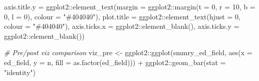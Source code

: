 \documentclass[
]{book}
\newenvironment{Shaded}{\begin{snugshade}}{\end{snugshade}}
\newcommand{\AttributeTok}[1]{\textcolor[rgb]{0.77,0.63,0.00}{#1}}
\newcommand{\CommentTok}[1]{\textcolor[rgb]{0.56,0.35,0.01}{\textit{#1}}}
\newcommand{\DecValTok}[1]{\textcolor[rgb]{0.00,0.00,0.81}{#1}}
\newcommand{\FunctionTok}[1]{\textcolor[rgb]{0.00,0.00,0.00}{#1}}
\newcommand{\NormalTok}[1]{#1}
\newcommand{\OtherTok}[1]{\textcolor[rgb]{0.56,0.35,0.01}{#1}}
\newcommand{\SpecialCharTok}[1]{\textcolor[rgb]{0.00,0.00,0.00}{#1}}
\newcommand{\StringTok}[1]{\textcolor[rgb]{0.31,0.60,0.02}{#1}}
\begin{document}
\begin{Shaded}
\begin{Highlighting}[]
               \AttributeTok{axis.title.y =}\NormalTok{ ggplot2}\SpecialCharTok{::}\FunctionTok{element\_text}\NormalTok{(}\AttributeTok{margin =}\NormalTok{ ggplot2}\SpecialCharTok{::}\FunctionTok{margin}\NormalTok{(}\AttributeTok{t =} \DecValTok{0}\NormalTok{, }\AttributeTok{r =} \DecValTok{10}\NormalTok{, }\AttributeTok{b =} \DecValTok{0}\NormalTok{, }\AttributeTok{l =} \DecValTok{0}\NormalTok{), }\AttributeTok{colour =} \StringTok{"\#404040"}\NormalTok{),}
               \AttributeTok{plot.title =}\NormalTok{ ggplot2}\SpecialCharTok{::}\FunctionTok{element\_text}\NormalTok{(}\AttributeTok{hjust =} \DecValTok{0}\NormalTok{, }\AttributeTok{colour =} \StringTok{"\#404040"}\NormalTok{),}
               \AttributeTok{axis.ticks.x =}\NormalTok{ ggplot2}\SpecialCharTok{::}\FunctionTok{element\_blank}\NormalTok{(),}
               \AttributeTok{axis.ticks.y =}\NormalTok{ ggplot2}\SpecialCharTok{::}\FunctionTok{element\_blank}\NormalTok{())}

\CommentTok{\# Pre/post viz comparison}
\NormalTok{viz\_pre }\OtherTok{\textless{}{-}}\NormalTok{ ggplot2}\SpecialCharTok{::}\FunctionTok{ggplot}\NormalTok{(smmry\_ed\_field, }\FunctionTok{aes}\NormalTok{(}\AttributeTok{x =}\NormalTok{ ed\_field, }\AttributeTok{y =}\NormalTok{ n, }\AttributeTok{fill =} \FunctionTok{as.factor}\NormalTok{(ed\_field))) }\SpecialCharTok{+}
\NormalTok{           ggplot2}\SpecialCharTok{::}\FunctionTok{geom\_bar}\NormalTok{(}\AttributeTok{stat =} \StringTok{"identity"}\NormalTok{) }


\end{Highlighting}
\end{Shaded}
\end{document}
